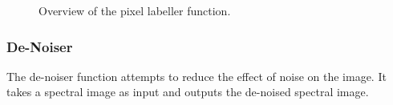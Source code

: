 \documentclass[12pt,twoside,notitlepage]{report}
\begin{document}
\begin{figure}[H]
{\begin{tikzpicture}[node distance=2cm,>=stealth',bend angle=45,auto]
                                    
                            \end{tikzpicture}
                        }

                    \caption{Overview of the pixel labeller function.}
                \end{figure} 




            \subsubsection{De-Noiser}
                The de-noiser function attempts to reduce the effect of noise on the image. It takes a spectral 
                image as input and outputs the de-noised spectral image.
\end{document}
